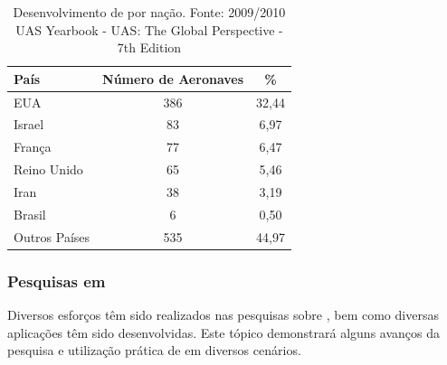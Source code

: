 \begin{table}[h!]
\centering
	\begin{tabular}{| l | c | c |}
		\hline
		País & Número de Aeronaves & \% \\
		\hline
		EUA & 386 & 32,44 \\
		Israel & 83 & 6,97 \\
		França & 77 & 6,47 \\
		Reino Unido & 65 & 5,46 \\
		Iran & 38 & 3,19 \\
		Brasil & 6 & 0,50\\
		Outros Países & 535 & 44,97 \\
		\hline
	\end{tabular}

	\caption{Desenvolvimento de \vants por nação. Fonte: 2009/2010 UAS Yearbook - UAS: The Global Perspective - 7th Edition}
	\label{tbl:country}
\end{table}


\subsubsection{Pesquisas em \vants}
Diversos esforços têm sido realizados nas pesquisas sobre \uavs, bem como diversas aplicações têm sido desenvolvidas. Este tópico demonstrará alguns avanços da pesquisa e
utilização prática de \vants em diversos cenários.

